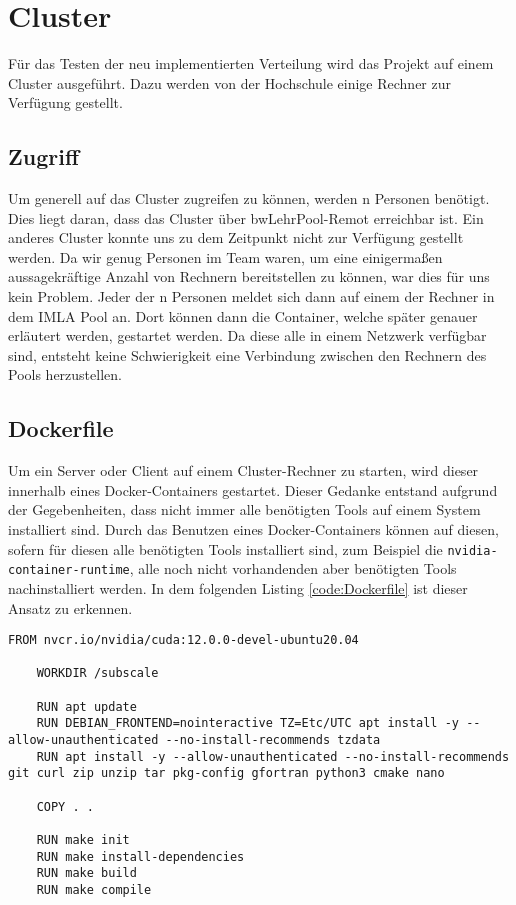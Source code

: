 \section{Cluster}
Für das Testen der neu implementierten Verteilung wird das Projekt auf einem Cluster ausgeführt. Dazu werden von der
Hochschule einige Rechner zur Verfügung gestellt.

\subsection{Zugriff}
Um generell auf das Cluster zugreifen zu können, werden n Personen benötigt. Dies liegt daran, dass das Cluster über
bwLehrPool-Remot erreichbar ist. Ein anderes Cluster konnte uns zu dem Zeitpunkt nicht zur Verfügung gestellt werden. Da
wir genug Personen im Team waren, um eine einigermaßen aussagekräftige Anzahl von Rechnern bereitstellen zu können, war
dies für uns kein Problem. Jeder der n Personen meldet sich dann auf einem der Rechner in dem IMLA Pool an. Dort können
dann die Container, welche später genauer erläutert werden, gestartet werden. Da diese alle in einem Netzwerk verfügbar
sind, entsteht keine Schwierigkeit eine Verbindung zwischen den Rechnern des Pools herzustellen.

\subsection{Dockerfile}
Um ein Server oder Client auf einem Cluster-Rechner zu starten, wird dieser innerhalb eines Docker-Containers gestartet.
Dieser Gedanke entstand aufgrund der Gegebenheiten, dass nicht immer alle benötigten Tools auf einem System installiert
sind. Durch das Benutzen eines Docker-Containers können auf diesen, sofern für diesen alle benötigten Tools installiert
sind, zum Beispiel die \verb|nvidia-container-runtime|, alle noch nicht vorhandenden aber benötigten Tools
nachinstalliert werden. In dem folgenden Listing \ref{code:Dockerfile} ist dieser Ansatz zu erkennen.

\begin{lstlisting}[caption=Dockerfile, label={code:Dockerfile}, captionpos=b]
    FROM nvcr.io/nvidia/cuda:12.0.0-devel-ubuntu20.04

    WORKDIR /subscale
    
    RUN apt update
    RUN DEBIAN_FRONTEND=nointeractive TZ=Etc/UTC apt install -y --allow-unauthenticated --no-install-recommends tzdata
    RUN apt install -y --allow-unauthenticated --no-install-recommends git curl zip unzip tar pkg-config gfortran python3 cmake nano
    
    COPY . .
    
    RUN make init
    RUN make install-dependencies
    RUN make build
    RUN make compile

\end{lstlisting}

